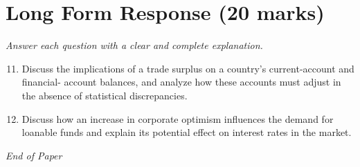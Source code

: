 \documentclass[12pt]{article}
\begin{document}
\section*{Long Form Response (20 marks)}
\textit{Answer each question with a clear and complete explanation.}
\begin{enumerate}[label=\arabic*.]
\setcounter{enumi}{10}
\item Discuss the implications of a trade surplus on a country's current-account and financial- account balances, and analyze how these accounts must adjust in the absence of statistical discrepancies.
\item Discuss how an increase in corporate optimism influences the demand for loanable funds and explain its potential effect on interest rates in the market.
\end{enumerate}

\vfill
\noindent\textit{End of Paper}
\end{document}
